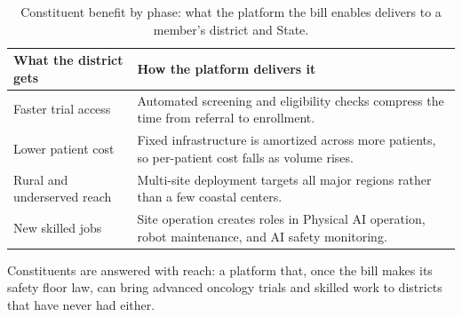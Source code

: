 \begin{table}[H]
\footnotesize
\begin{tabularx}{\textwidth}{@{}L{3.0cm} Y@{}}
\toprule
\textbf{What the district gets} & \textbf{How the platform delivers it}\\
\midrule
Faster trial access & Automated screening and eligibility checks compress the time from referral to enrollment.\\
Lower patient cost & Fixed infrastructure is amortized across more patients, so per-patient cost falls as volume rises.\\
Rural and underserved reach & Multi-site deployment targets all major regions rather than a few coastal centers.\\
New skilled jobs & Site operation creates roles in Physical AI operation, robot maintenance, and AI safety monitoring.\\
\bottomrule
\end{tabularx}
\caption{Constituent benefit by phase: what the platform the bill enables delivers to
a member's district and State.}
\label{tab:constituents}
\end{table}

Constituents are answered with reach: a platform that, once the bill makes its safety
floor law, can bring advanced oncology trials and skilled work to districts that have
never had either.
